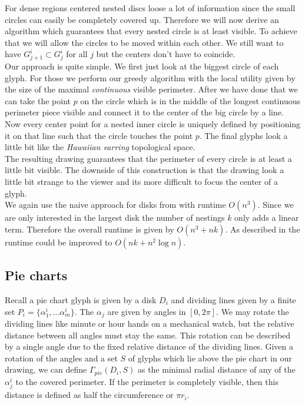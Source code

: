 \documentclass[a4paper,11pt]{article}
\begin{document}
For dense regions centered nested discs loose a lot of information since the small circles can easily be completely covered up. Therefore we will now derive an algorithm which guarantees that every nested circle is at least visible. To achieve that we will allow the circles to be moved within each other. We still want to have $G^i_{j+1}\subset G^i_j$ for all $j$ but the centers don't have to coincide.\\

Our approach is quite simple. We first just look at the biggest circle of each glyph. For those we perform our greedy algorithm with the local utility given by the size of the maximal \textit{continuous} visible perimeter. After we have done that we can take the point $p$ on the circle which is in the middle of the longest continuous perimeter piece visible and connect it to the center of the big circle by a line. Now every center point for a nested inner circle is uniquely defined by positioning it on that line such that the circle touches the point $p$. The final glyphs look a little bit like the \textit{Hawaiian earring} topological space.\\

The resulting drawing guarantees that the perimeter of every circle is at least a little bit visible. The downside of this construction is that the drawing look a little bit strange to the viewer and its more difficult to focus the center of a glyph. \\

We again use the naive approach for disks from \cite{caballo} with runtime $O(n^3)$. Since we are only interested in the largest disk the number of nestings $k$ only adds a linear term. Therefore the overall runtime is given by $O(n^3+nk)$. As described in \cite{caballo} the runtime could be improved to $O(nk+n^2 \log n)$.


\subsection{Pie charts}

Recall a pie chart glyph is given by a disk $D_i$ and dividing lines given by a finite set $P_i= \{\alpha_1^i,...\alpha_m^i\}$. The $\alpha_j$ are given by angles in $[0,2\pi ]$. We may rotate the dividing lines like minute or hour hands on a mechanical watch, but the relative distance between all angles must stay the same. This rotation can be described by a single angle due to the fixed relative distance of the dividing lines. Given a rotation of the angles and a set $S$ of glyphs which lie above the pie chart in our drawing, we can define $\Gamma_{pie}(D_i,S)$ as the minimal radial distance of any of the $\alpha^i_j$ to the covered perimeter. If the perimeter is completely visible, then this distance is defined as half the circumference or $\pi r_i$.\\
\end{document}
